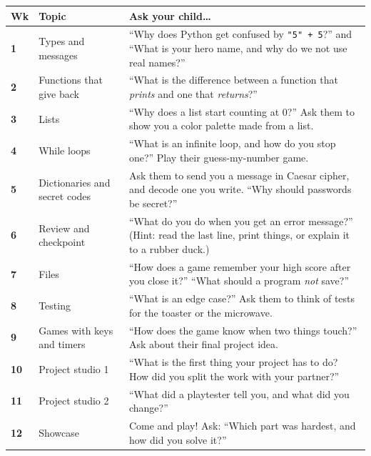 \documentclass[level=2]{kidscode}
\begin{document}
{\small
\renewcommand{\arraystretch}{1.3}
\begin{longtable}{@{}>{\bfseries}p{0.8cm}>{\raggedright\arraybackslash}p{4.0cm}>{\raggedright\arraybackslash}p{9.8cm}@{}}
\toprule
Wk & Topic & Ask your child\ldots \\ \midrule\endhead
1 & Types and messages & \enquote{Why does Python get confused by \texttt{"5" + 5}?} and \enquote{What is your hero name, and why do we not use real names?} \\
2 & Functions that give back & \enquote{What is the difference between a function that \emph{prints} and one that \emph{returns}?} \\
3 & Lists & \enquote{Why does a list start counting at 0?} Ask them to show you a color palette made from a list. \\
4 & While loops & \enquote{What is an infinite loop, and how do you stop one?} Play their guess-my-number game. \\
5 & Dictionaries and secret codes & Ask them to send you a message in Caesar cipher, and decode one you write. \enquote{Why should passwords be secret?} \\
6 & Review and checkpoint & \enquote{What do you do when you get an error message?} (Hint: read the last line, print things, or explain it to a rubber duck.) \\
7 & Files & \enquote{How does a game remember your high score after you close it?} \enquote{What should a program \emph{not} save?} \\
8 & Testing & \enquote{What is an edge case?} Ask them to think of tests for the toaster or the microwave. \\
9 & Games with keys and timers & \enquote{How does the game know when two things touch?} Ask about their final project idea. \\
10 & Project studio 1 & \enquote{What is the first thing your project has to do? How did you split the work with your partner?} \\
11 & Project studio 2 & \enquote{What did a playtester tell you, and what did you change?} \\
12 & Showcase & Come and play! Ask: \enquote{Which part was hardest, and how did you solve it?} \\
\bottomrule
\end{longtable}}
\end{document}
